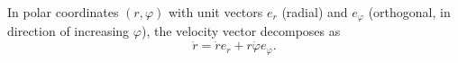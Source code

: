 In polar coordinates $(r, \varphi)$ with unit vectors $e_r$ (radial) and $e_\varphi$ (orthogonal, in direction of increasing $\varphi$), the velocity vector decomposes as
$$\dot{r} = \dot{r} e_r + r \dot{\varphi} e_\varphi.$$
